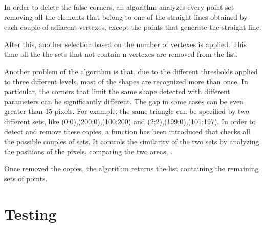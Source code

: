 		In order to delete the false corners, an algorithm analyzes every point set removing all the elements that belong to one of the straight lines obtained by each couple of adiacent vertexes, except the points that generate the straight line. 
		
		After this, another selection based on the number of vertexes is applied. This time all the the sets that not contain n vertexes are removed from the list.
		
		 
				
		
		Another problem of the algorithm is that, due to the different thresholds applied to three different levels, most of the shapes are recognized more than once.
		In particular, the corners that limit the same shape detected with different parameters can be significantly different.  
		The gap in some cases can be even greater than 15 pixels. 
		For example, the same triangle can be specified by two different sets, like {(0;0),(200;0),(100;200)} and {(2;2),(199;0),(101;197)}. 
		In order to detect and remove these copies, a function  has been introduced that checks all the possible couples of sets. 
		It controls the similarity of the two sets by analyzing the positions of the pixels, comparing the two areas, .
		
		Once removed the copies, the algorithm returns the list containing the remaining sets of points.

\begin{comment}		
		various parameters like the positions of pixels, the areas and the positions of each couple of 
	
		Then, the corners of each shape are "uniti" thanks to an algorithm of fi
		
		In order to detect the douls
\end{comment}
	

	

	\section{Testing}

